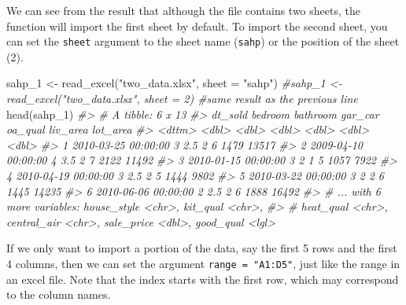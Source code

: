 \documentclass[
]{book}
\newenvironment{Shaded}{\begin{snugshade}}{\end{snugshade}}
\newcommand{\AttributeTok}[1]{\textcolor[rgb]{0.77,0.63,0.00}{#1}}
\newcommand{\CommentTok}[1]{\textcolor[rgb]{0.56,0.35,0.01}{\textit{#1}}}
\newcommand{\FunctionTok}[1]{\textcolor[rgb]{0.00,0.00,0.00}{#1}}
\newcommand{\NormalTok}[1]{#1}
\newcommand{\OtherTok}[1]{\textcolor[rgb]{0.56,0.35,0.01}{#1}}
\newcommand{\StringTok}[1]{\textcolor[rgb]{0.31,0.60,0.02}{#1}}
\begin{document}
We can see from the result that although the file contains two sheets, the function will import the first sheet by default. To import the second sheet, you can set the \texttt{sheet} argument to the sheet name (\texttt{sahp}) or the position of the sheet (2).

\begin{Shaded}
\begin{Highlighting}[]
\NormalTok{sahp\_1 }\OtherTok{\textless{}{-}} \FunctionTok{read\_excel}\NormalTok{(}\StringTok{"two\_data.xlsx"}\NormalTok{, }\AttributeTok{sheet =} \StringTok{"sahp"}\NormalTok{)}
\CommentTok{\#sahp\_1 \textless{}{-} read\_excel("two\_data.xlsx", sheet = 2)     \#same result as the previous line}
\FunctionTok{head}\NormalTok{(sahp\_1)}
\CommentTok{\#\textgreater{} \# A tibble: 6 x 13}
\CommentTok{\#\textgreater{}   dt\_sold             bedroom bathroom gar\_car oa\_qual liv\_area lot\_area}
\CommentTok{\#\textgreater{}   \textless{}dttm\textgreater{}                \textless{}dbl\textgreater{}    \textless{}dbl\textgreater{}   \textless{}dbl\textgreater{}   \textless{}dbl\textgreater{}    \textless{}dbl\textgreater{}    \textless{}dbl\textgreater{}}
\CommentTok{\#\textgreater{} 1 2010{-}03{-}25 00:00:00       3      2.5       2       6     1479    13517}
\CommentTok{\#\textgreater{} 2 2009{-}04{-}10 00:00:00       4      3.5       2       7     2122    11492}
\CommentTok{\#\textgreater{} 3 2010{-}01{-}15 00:00:00       3      2         1       5     1057     7922}
\CommentTok{\#\textgreater{} 4 2010{-}04{-}19 00:00:00       3      2.5       2       5     1444     9802}
\CommentTok{\#\textgreater{} 5 2010{-}03{-}22 00:00:00       3      2         2       6     1445    14235}
\CommentTok{\#\textgreater{} 6 2010{-}06{-}06 00:00:00       2      2.5       2       6     1888    16492}
\CommentTok{\#\textgreater{} \# ... with 6 more variables: house\_style \textless{}chr\textgreater{}, kit\_qual \textless{}chr\textgreater{},}
\CommentTok{\#\textgreater{} \#   heat\_qual \textless{}chr\textgreater{}, central\_air \textless{}chr\textgreater{}, sale\_price \textless{}dbl\textgreater{}, good\_qual \textless{}lgl\textgreater{}}
\end{Highlighting}
\end{Shaded}

If we only want to import a portion of the data, say the first 5 rows and the first 4 columns, then we can set the argument \texttt{range\ =\ "A1:D5"}, just like the range in an excel file. Note that the index starts with the first row, which may correspond to the column names.
\end{document}
